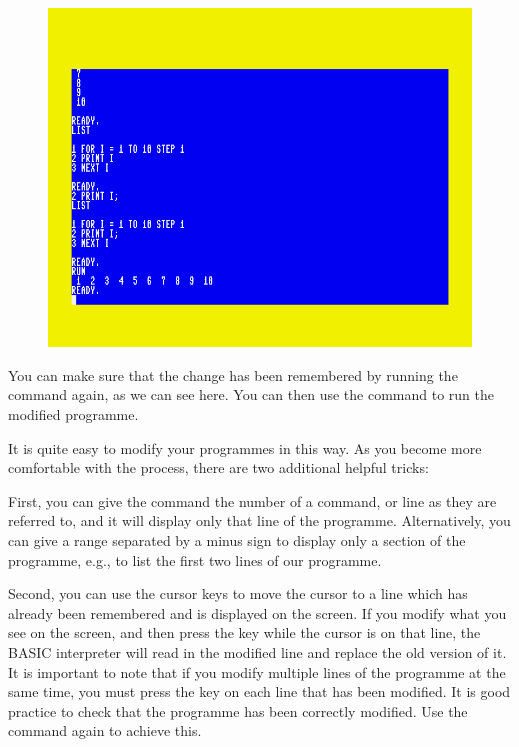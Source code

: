   \setlength{\intextsep}{0pt}%
  \begin{figure}
    \includegraphics[width=\linewidth]{images/first-steps-for-loop-programme-1-modified.png}
  \end{figure}

You can make sure that the change has been remembered by running the  command again, as we can see here.
You can then use the  command to run the modified programme.

It is quite easy to modify your programmes in this way.  As you become more comfortable with the process, there are two
additional helpful tricks:

First, you can give the  command the number of a command, or line as they are referred to, and it will display only
that line of the programme.  Alternatively, you can give a range separated by a minus sign to display only a section of the programme,
e.g.,  to list the first two lines of our programme.

Second, you can use the cursor keys to move the cursor to a line which has already been remembered and is displayed on the screen. If you
modify what you see on the screen, and then press the  key while the cursor is on that line, the BASIC interpreter will
read in the modified line and replace the old version of it.  It is important to note that if you modify multiple lines of the programme
at the same time, you must press the  key on each line that has been modified. It is good practice to check that the
programme has been correctly modified. Use the  command again to achieve this.
  
